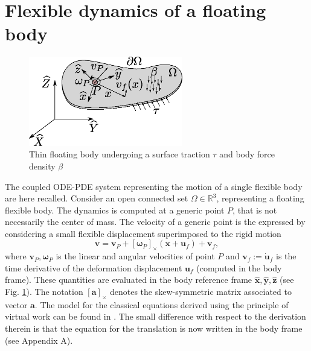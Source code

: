 \documentclass{svjour3}                     %
\newcommand{\crmat}[1]{\ensuremath{[#1]_{\times}}}
\begin{document}
 

\section{Flexible dynamics of a floating body}
\label{sec:class_model}
\begin{figure}[t]
	\centering
	\includegraphics[width=0.6\textwidth]{floating_body.eps} 
	\caption{Thin floating body undergoing a surface traction $\tau$ and body force density $\beta$}
	\label{fig:float_body}
\end{figure}
The coupled ODE-PDE system representing the motion of a single flexible body are here recalled.  Consider an open connected set $\Omega \in \mathbb{R}^3$, representing a floating flexible body. The dynamics is computed at a generic point $P$, that is not necessarily the center of mass. The velocity of a generic point is the expressed by considering a small flexible displacement superimposed to the rigid motion
\[
\bm{v} = \bm{v}_P + \crmat{\bm{\omega}_P} (\bm{x}+\bm{u}_f) + \bm{v}_f,
\]
where $\bm{v}_P, \bm{\omega}_P$ is the linear and angular velocities of point $P$  and $\bm{v}_f := \dot{\bm{u}}_f$ is the time derivative of the deformation displacement $\bm{u}_f$ (computed in the body frame). These quantities are evaluated in the body reference frame $\widehat{\bm{x}}, \widehat{\bm{y}}, \widehat{\bm{z}}$ (see Fig. \ref{fig:float_body}). The notation $\crmat{\bm{a}}$ denotes the skew-symmetric matrix associated to vector $\bm{a}$. The model for the classical equations derived using the principle of virtual work can be found in \cite{MB_Daepde,simeon2013computational}. The small difference with respect to the derivation therein is that the equation for the translation is now written in the body frame (see Appendix A). 
\end{document}
